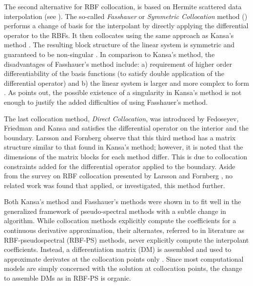 \documentclass{report}
\begin{document}
{The second alternative for RBF collocation, is based on Hermite scattered 
data interpolation (see \cite{Wu1992}). The so-called \emph{Fasshauer} or \emph{Symmetric Collocation} method (\cite{Fasshauer1997}) 
performs a change of basis for the interpolant by directly applying the differential operator to the RBFs. It then collocates using the same approach as Kansa's method \cite{Stevens2009b, Larsson2003}. The resulting block structure of the linear system is symmetric and 
guaranteed to be non-singular \cite{Fasshauer1997}. In comparison to Kansa's method, the disadvantages of Fasshauer's method 
include: a) requirement of higher order differentiability of the basis functions (to satisfy double application of the differential operator)
and b) the linear system is larger and more complex to form
 \cite{Fasshauer2007}. As \cite{Hon2001} points out, 
the possible existence of a singularity in Kansa's method is not enough to justify the added difficulties of using Fasshauer's 
method.


The last collocation method, \emph{Direct Collocation}, was introduced by Fedoseyev, Friedman and Kansa
 \cite{Fedoseyev2002} and satisfies the differential operator on the interior and the boundary. Larsson and Fornberg \cite{Larsson2003} observe that this third method has a matrix structure similar to that found in Kansa's method; however, it is noted that the dimensions of the matrix blocks for each method differ. This is due to collocation constraints added for 
the differential operator applied to the boundary. Aside from the survey on RBF collocation presented by Larsson and Fornberg \cite{Larsson2003}, no related 
work was found that applied, or investigated, this method further.  

Both Kansa's method and Fasshauer's methods were shown in \cite{Fasshauer2006} to fit well in the generalized framework of pseudo-spectral methods with a subtle change in algorithm. While collocation methods explicitly compute the coefficients for a continuous derivative approximation, their alternates, referred to in literature as RBF-pseudospectral (RBF-PS) methods, never explicitly compute the interpolant coefficients. Instead, a differentiation matrix (DM) is assembled and used to approximate derivates at the collocation points only \cite{FasshauerZhang2007}. Since most computational models are simply concerned with the solution at collocation points, the change to assemble DMs as in RBF-PS is organic. 


}
\end{document}
